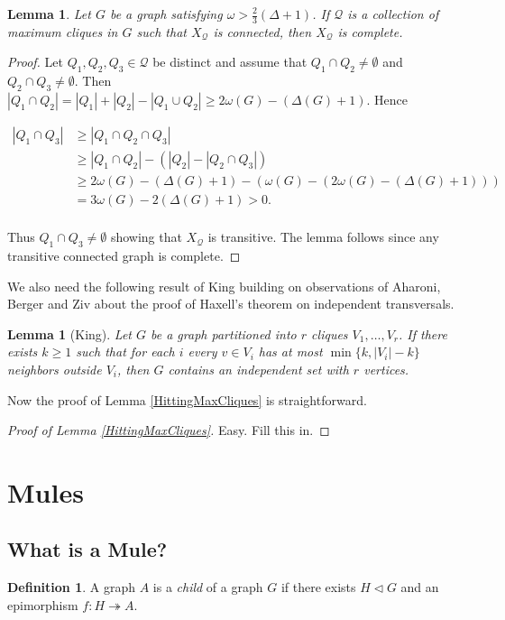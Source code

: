\documentclass[12pt]{article}
\theoremstyle{plain}
\newtheorem{lem}[thm]{Lemma}
\theoremstyle{definition}
\newtheorem{defn}{Definition}[section]
\theoremstyle{remark}
\newcommand{\surj}{\twoheadrightarrow}
\newcommand{\card}[1]{\left|#1\right|}
\begin{document}
\begin{lem}\label{TwoThirdsLemma}
Let $G$ be a graph satisfying $\omega > \frac{2}{3}(\Delta + 1)$.   If $\mathcal{Q}$ is a collection of maximum cliques in $G$ such that $X_{\mathcal{Q}}$ is connected, then $X_{\mathcal{Q}}$ is complete.
\end{lem}
\begin{proof}
Let $Q_1, Q_2, Q_3 \in \mathcal{Q}$ be distinct and assume that $Q_1 \cap Q_2 \neq \emptyset$ and $Q_2 \cap Q_3 \neq \emptyset$.  Then $|Q_1 \cap Q_2| = |Q_1| + |Q_2| - |Q_1 \cup Q_2| \geq 2\omega(G) - (\Delta(G) + 1)$.  Hence

\begin{align*}
|Q_1 \cap Q_3| &\geq |Q_1 \cap Q_2 \cap Q_3| \\
&\geq |Q_1 \cap Q_2| - (|Q_2| - |Q_2 \cap Q_3|) \\
&\geq 2\omega(G) - (\Delta(G) + 1) - (\omega(G) - (2\omega(G) - (\Delta(G) + 1))) \\
&= 3\omega(G) - 2(\Delta(G) + 1) > 0.\\
\end{align*}

Thus $Q_1 \cap Q_3 \neq \emptyset$ showing that $X_{\mathcal{Q}}$ is transitive.  The lemma follows since any transitive connected graph is complete.
\end{proof}

We also need the following result of King building on observations of Aharoni, Berger and Ziv about the proof of Haxell's theorem on independent transversals.
\begin{lem}[King]\label{LopsidedISR}
Let $G$ be a graph partitioned into $r$ cliques $V_1, \ldots, V_r$.  If there exists $k \geq 1$ such that for each $i$ every $v \in V_i$ has at most $\min\{k, \card{V_i} - k\}$ neighbors outside $V_i$, then $G$ contains an independent set with $r$ vertices.
\end{lem}

Now the proof of Lemma \ref{HittingMaxCliques} is straightforward.

\begin{proof}[Proof of Lemma \ref{HittingMaxCliques}]
Easy.  Fill this in.
\end{proof}

\section{Mules}
\subsection{What is a Mule?}
\begin{defn}
A graph $A$ is a \emph{child} of a graph $G$ if there exists $H \lhd G$ and an epimorphism $f\colon H \surj A$.  
\end{defn}
\end{document}
